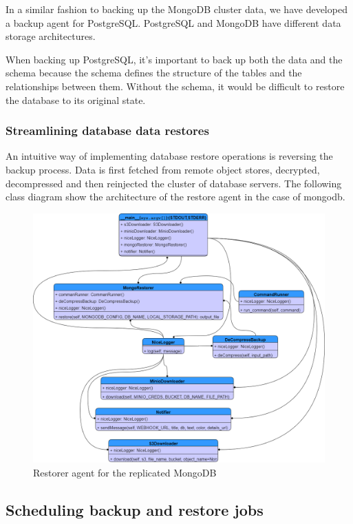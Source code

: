In a similar fashion to backing up the MongoDB cluster data, we have developed a backup agent for PostgreSQL. PostgreSQL and MongoDB have different data storage architectures.  

When backing up PostgreSQL, it's important to back up both the data and the schema because the schema defines the structure of the tables and the relationships between them. Without the schema, it would be difficult to restore the database to its original state.

\subsubsection{Streamlining database data restores}

An intuitive way of implementing database restore operations is reversing the backup process. Data is first fetched from remote object stores, decrypted, decompressed and then reinjected the cluster of database servers. The following class diagram show the architecture of the restore agent in the case of mongodb.

\begin{figure}[H]\centering
\includegraphics[width=1.0\textwidth,angle=00]{assets/f60.png}
\caption{Restorer agent for the replicated MongoDB }
\label{fig:f60}
\end{figure}

\subsection{ Scheduling backup and restore jobs }

